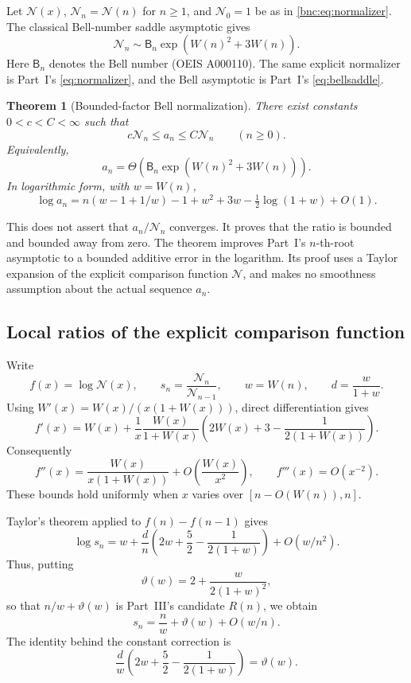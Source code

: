 \documentclass[11pt]{article}
\numberwithin{equation}{section}
\newtheorem{theorem}{Theorem}[section]
\theoremstyle{definition}
\theoremstyle{remark}
\begin{document}
Let \(\mathcal N(x)\), \(\mathcal N_n=\mathcal N(n)\) for \(n\ge1\), and
\(\mathcal N_0=1\) be as in \eqref{bnc:eq:normalizer}.
The classical Bell-number saddle asymptotic gives
\[
 \mathcal N_n\sim \mathsf B_n\exp(W(n)^2+3W(n)).
\]
Here \(\mathsf B_n\) denotes the Bell number (OEIS A000110).
The same explicit normalizer is Part~I's \eqref{eq:normalizer}, and the
Bell asymptotic is Part~I's \eqref{eq:bellsaddle}.

\begin{theorem}[Bounded-factor Bell normalization]\label{bnc:thm:bellbounds}
There exist constants \(0<c<C<\infty\) such that
\[
 c\mathcal N_n\le a_n\le C\mathcal N_n
 \qquad(n\ge0).
\]
Equivalently,
\[
 \boxed{
 a_n=\Theta\!\left(\mathsf B_n\exp(W(n)^2+3W(n))\right).}
\]
In logarithmic form, with \(w=W(n)\),
\[
 \boxed{
 \log a_n
 =n(w-1+1/w)-1+w^2+3w-\tfrac12\log(1+w)+O(1).}
\]
\end{theorem}

This does not assert that \(a_n/\mathcal N_n\) converges.
It proves that the ratio is bounded and bounded away from zero.
The theorem improves Part~I's
\(n\)-th-root asymptotic to a bounded additive error in the logarithm.
Its proof uses a Taylor expansion of the explicit comparison function
\(\mathcal N\), and makes no smoothness assumption about the actual
sequence \(a_n\).

\subsection{Local ratios of the explicit comparison function}

Write
\[
 f(x)=\log\mathcal N(x),\qquad
 s_n=\frac{\mathcal N_n}{\mathcal N_{n-1}},\qquad
 w=W(n),\qquad d=\frac{w}{1+w}.
\]
Using \(W'(x)=W(x)/(x(1+W(x)))\), direct differentiation gives
\[
 f'(x)=W(x)+\frac{1}{x}
 \frac{W(x)}{1+W(x)}
 \left(2W(x)+3-\frac{1}{2(1+W(x))}\right).
\]
Consequently
\begin{equation}\label{bnc:eq:bell-5}
f''(x)=\frac{W(x)}{x(1+W(x))}
          +O\!\left(\frac{W(x)}{x^2}\right),
 \qquad
 f'''(x)=O(x^{-2}).
\end{equation}
These bounds hold uniformly when \(x\) varies over
\([n-O(W(n)),n]\).

Taylor's theorem applied to \(f(n)-f(n-1)\) gives
\[
 \log s_n
 =w+\frac{d}{n}
    \left(2w+\frac52-\frac1{2(1+w)}\right)
       +O(w/n^2).
\]
Thus, putting
\[
 \vartheta(w)=2+\frac{w}{2(1+w)^2},
\]
so that \(n/w+\vartheta(w)\) is Part~III's candidate \(R(n)\),
we obtain
\begin{equation}\label{bnc:eq:bell-6}
s_n=\frac n w+\vartheta(w)+O(w/n).
\end{equation}
The identity behind the constant correction is
\[
 \frac{d}{w}
    \left(2w+\frac52-\frac1{2(1+w)}\right)
       =\vartheta(w).
\]
\end{document}
